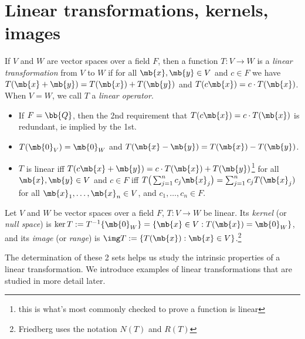 \section{Linear transformations, kernels, images}
\begin{defn}
If $V$ and $W$ are vector spaces over a field $F$, then a function $T:V \to W$ is a \emph{linear transformation} from $V$ to $W$ if for all $\mb{x}, \mb{y}\in V$ and $c \in F$ we have $T( \mb{x}+ \mb{y})=T( \mb{x})+T( \mb{y})$ and $T(c \mb{x})=c \cdot T( \mb{x})$. When $V=W$, we call $T$ a \emph{linear operator}.
\end{defn}
\begin{exer}
\begin{itemize}
\item If $F= \bb{Q}$, then the 2nd requirement that $T(c \mb{x})=c \cdot T( \mb{x})$ is redundant, ie implied by the 1st.
\item $T( \mb{0}_V)= \mb{0}_W$ and $T( \mb{x}- \mb{y})=T( \mb{x})-T( \mb{y})$.
\item $T$ is linear iff $T(c \mb{x}+ \mb{y})=c \cdot T( \mb{x})+T( \mb{y})$\footnote{this is what's most commonly checked to prove a function is linear} for all $\mb{x}, \mb{y}\in V$ and $c \in F$ iff $T \big( \sum_{j=1}^nc_j \mb{x}_j \big)= \sum_{j=1}^nc_j T( \mb{x}_j)$ for all $\mb{x}_1, \ldots, \mb{x}_n \in V$, and $c_1, \ldots,c_n \in F$.
\end{itemize}
\end{exer}
\begin{defn}
Let $V$ and $W$ be vector spaces over a field $F$, $T:V \to W$ be linear. Its \emph{kernel} (or \emph{null space}) is $\ker T:=T^{-1}\{ \mb{0}_W \}= \{ \mb{x}\in V: T( \mb{x})= \mb{0}_W \}$, and its \emph{image} (or \emph{range}) is $\img T:= \{ T( \mb{x}): \mb{x}\in V \}$.\footnote{Friedberg uses the notation $N(T)$ and $R(T)$}
\end{defn}
The determination of these 2 sets helps us study the intrinsic properties of a linear transformation.
We introduce examples of linear transformations that are studied in more detail later.
